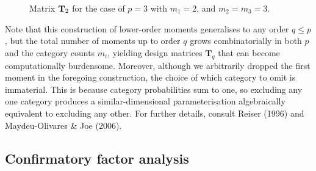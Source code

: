 \documentclass[
  letterpaper,
  DIV=11,
  numbers=noendperiod]{scrartcl}
\begin{document}
\begin{figure}


\caption{\label{fig-T2-matrix}Matrix \({\mathbf T}_2\) for the case of \(p=3\)
with \(m_1=2\), and \(m_2=m_3=3\).}

\end{figure}%

Note that this construction of lower-order moments generalises to any
order \(q \le p\), but the total number of moments up to order \(q\)
grows combinatorially in both \(p\) and the category counts \(m_i\),
yielding design matrices \(\mathbf{T}_q\) that can become
computationally burdensome. Moreover, although we arbitrarily dropped
the first moment in the foregoing construction, the choice of which
category to omit is immaterial. This is because category probabilities
sum to one, so excluding any one category produces a similar-dimensional
parameterisation algebraically equivalent to excluding any other. For
further details, consult Reiser (1996) and Maydeu-Olivares \& Joe
(2006).

\subsection{Confirmatory factor
analysis}\label{confirmatory-factor-analysis}
\end{document}
